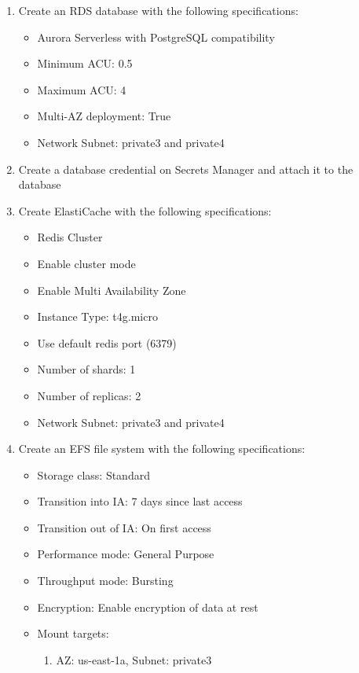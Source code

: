 \documentclass{article}
\begin{document}
\begin{enumerate}
\begin{itemize}
        \end{itemize}
    \item Create an RDS database with the following specifications:
    \begin{itemize}
        \item Aurora Serverless with PostgreSQL compatibility
        \item Minimum ACU: 0.5
        \item Maximum ACU: 4
        \item Multi-AZ deployment: True
        \item Network Subnet: private3 and private4
    \end{itemize}
    \item Create a database credential on Secrets Manager and attach it to the database
    \item Create ElastiCache with the following specifications:
    \begin{itemize}
        \item Redis Cluster
        \item Enable cluster mode
        \item Enable Multi Availability Zone
        \item Instance Type: t4g.micro
        \item Use default redis port (6379)
        \item Number of shards: 1
        \item Number of replicas: 2
        \item Network Subnet: private3 and private4
    \end{itemize}
    \item Create an EFS file system with the following specifications:
    \begin{itemize}
        \item Storage class: Standard
        \item Transition into IA: 7 days since last access
        \item Transition out of IA: On first access
        \item Performance mode: General Purpose
        \item Throughput mode: Bursting
        \item Encryption: Enable encryption of data at rest
        \item Mount targets:
        \begin{enumerate}
            \item AZ: us-east-1a, Subnet: private3

\end{enumerate}
\end{itemize}
\end{enumerate}
\end{document}
